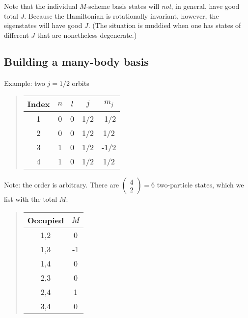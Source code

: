 \documentclass[%
twoside,                 %
final,                   %
10pt]{article}
\begin{document}
\noindent
Note that the individual $M$-scheme basis states will \emph{not}, in general, 
have good total $J$. 
Because the Hamiltonian is rotationally invariant, however, the eigenstates will 
have good $J$. (The situation is muddied when one has states of different $J$ that are 
nonetheless degenerate.)




\subsection*{Building a many-body basis}

\paragraph{}
Example: two $j=1/2$ orbits


\begin{quote}
\begin{tabular}{ccccc}
\hline
\multicolumn{1}{c}{ Index } & \multicolumn{1}{c}{ $n$ } & \multicolumn{1}{c}{ $l$ } & \multicolumn{1}{c}{ $j$ } & \multicolumn{1}{c}{ $m_j$ } \\
\hline
1     & 0   & 0   & 1/2 & -1/2  \\
2     & 0   & 0   & 1/2 & 1/2   \\
3     & 1   & 0   & 1/2 & -1/2  \\
4     & 1   & 0   & 1/2 & 1/2   \\
\hline
\end{tabular}
\end{quote}

\noindent
Note: the order is arbitrary.
There are $\left ( \begin{array}{c} 4 \\ 2 \end{array} \right) = 6$ two-particle states, 
which we list with the total $M$:


\begin{quote}
\begin{tabular}{cc}
\hline
\multicolumn{1}{c}{ Occupied } & \multicolumn{1}{c}{ $M$ } \\
\hline
1,2      & 0   \\
1,3      & -1  \\
1,4      & 0   \\
2,3      & 0   \\
2,4      & 1   \\
3,4      & 0   \\
\hline
\end{tabular}
\end{quote}
\end{document}
